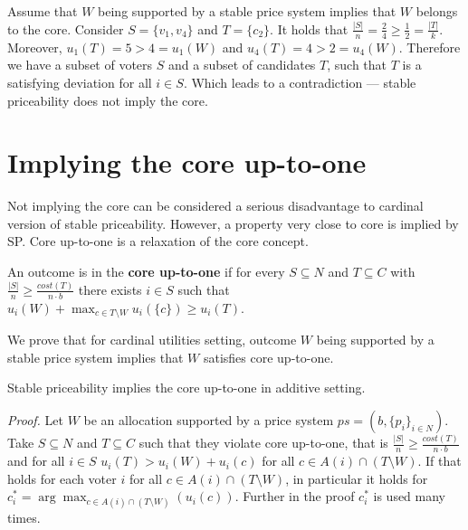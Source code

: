 \begin{counterexample}
Assume that $W$ being supported by a stable price system implies that $W$ belongs to the core. Consider $S=\{v_1,v_4\}$ and $T=\{c_2\}$. It holds that $\frac{|S|}{n} = \frac{2}{4} \ge \frac{1}{2} = \frac{|T|}{k}$. Moreover, $u_1(T)=5>4=u_1(W)$ and $u_4(T)=4>2=u_4(W)$. Therefore we have a subset of voters $S$ and a subset of candidates $T$, such that $T$ is a satisfying deviation for all $i\in S$. Which leads to a contradiction --- stable priceability does not imply the core. 
\end{counterexample}
\section{Implying the core up-to-one}
Not implying the core can be considered a serious disadvantage to cardinal version of stable priceability. However, a property very close to core is implied by SP. Core up-to-one is a relaxation of the core concept.
\begin{definition}
An outcome is in the \textbf{core up-to-one} if for every $S\subseteq N$ and $T\subseteq C$ with $\frac{|S|}{n}\ge \frac{cost(T)}{n\cdot b}$ there exists $i\in S$ such that $u_i(W) + \max_{c\in T\setminus W} u_i(\{c\})\ge u_i(T)$.
\end{definition}
We prove that for cardinal utilities setting, outcome $W$ being supported by a stable price system implies that $W$ satisfies core up-to-one.
\begin{theorem}
    Stable priceability implies the core up-to-one in additive setting.
\end{theorem}
\emph{Proof.} Let $W$ be an allocation supported by a price system $ps=(b, \{p_i\}_{i\in N})$. Take $S\subseteq N$ and $T\subseteq C$ such that they violate core up-to-one, that is $\frac{|S|}{n}\ge\frac{cost(T)}{n\cdot b}$ and for all $i\in S$ $u_i(T)>u_i(W)+u_i(c)$ for all $c\in A(i)\cap (T\setminus W)$. If that holds for each voter $i$ for all $c\in A(i)\cap(T\setminus W)$, in particular it holds for $c_i^*=\arg\max_{c\in A(i)\cap (T\setminus W)}(u_i(c))$. Further in the proof $c_i^*$ is used many times. 

